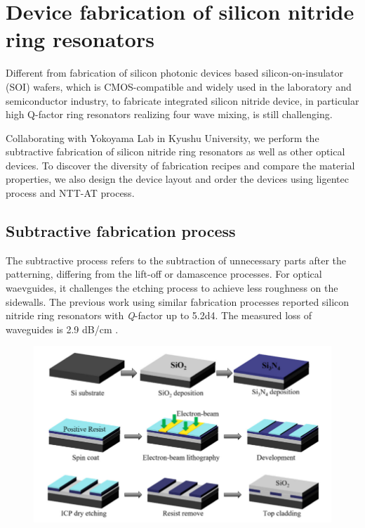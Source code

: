 
\chapter{Device fabrication of silicon nitride ring resonators}

Different from fabrication of silicon photonic devices based silicon-on-insulator (SOI) wafers, which is CMOS-compatible and widely used in the laboratory and semiconductor industry, to fabricate integrated silicon nitride device, in particular high Q-factor ring resonators realizing four wave mixing, is still challenging.

Collaborating with Yokoyama Lab in Kyushu University, we perform the subtractive fabrication of silicon nitride ring resonators as well as other optical devices. To discover the diversity of fabrication recipes and compare the material properties, we also design the device layout and order the devices using ligentec process and NTT-AT process.

\section{Subtractive fabrication process}

The subtractive process refers to the subtraction of unnecessary parts after the patterning, differing from the lift-off or damascence processes. For optical waevguides, it challenges the etching process to achieve less roughness on the sidewalls. 
The previous work using similar fabrication processes reported silicon nitride ring resonators with \textit{Q}-factor up to \num{5.2d4}. The measured loss of waveguides is 2.9 dB/cm \cite{Cheng2017b}. 

\begin{figure}
	\centering
	\includegraphics[width=1.0\linewidth]{imgs/png/fab-flow}
	\label{fig:fab-flow}
\end{figure}

